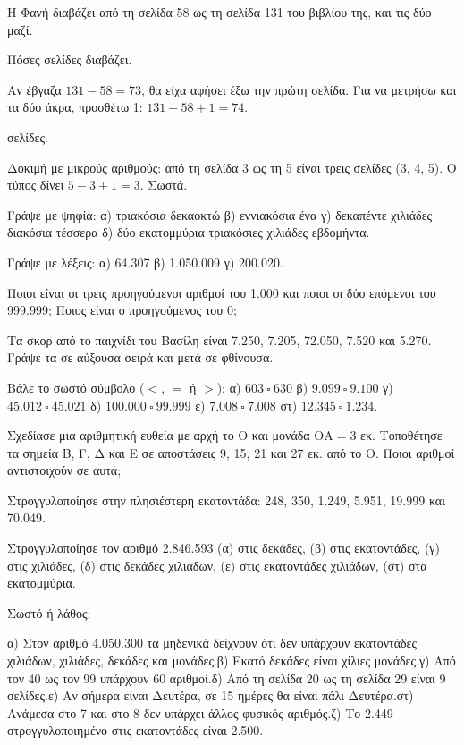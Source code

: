 \tixero Η Φανή διαβάζει από τη σελίδα 58 ως τη σελίδα 131 του βιβλίου της, και τις δύο μαζί.\par
\tithelo Πόσες σελίδες διαβάζει.\par
\possindeo Αν έβγαζα $131-58=73$, θα είχα αφήσει έξω την πρώτη σελίδα. Για να μετρήσω και τα δύο άκρα, προσθέτω 1: $131-58+1=74$.\par
{} σελίδες.\par
\elegxos Δοκιμή με μικρούς αριθμούς: από τη σελίδα 3 ως τη 5 είναι τρεις σελίδες (3, 4, 5). Ο τύπος δίνει $5-3+1=3$. Σωστά.



\ex Γράψε με ψηφία: α) τριακόσια δεκαοκτώ \quad β) εννιακόσια ένα \quad γ) δεκαπέντε χιλιάδες διακόσια τέσσερα \quad δ) δύο εκατομμύρια τριακόσιες χιλιάδες εβδομήντα.

\ex Γράψε με λέξεις: α) 64.307 \quad β) 1.050.009 \quad γ) 200.020.

\ex Ποιοι είναι οι τρεις προηγούμενοι αριθμοί του 1.000 και ποιοι οι δύο επόμενοι του 999.999; Ποιος είναι ο προηγούμενος του 0;

\ex Τα σκορ από το παιχνίδι του Βασίλη είναι 7.250, 7.205, 72.050, 7.520 και 5.270. Γράψε τα σε αύξουσα σειρά και μετά σε φθίνουσα.

\ex Βάλε το σωστό σύμβολο ($<$, $=$ ή $>$): α) $603\ \square\ 630$ \quad β) $9.099\ \square\ 9.100$ \quad γ) $45.012\ \square\ 45.021$ \quad δ) $100.000\ \square\ 99.999$ \quad ε) $7.008\ \square\ 7.008$ \quad στ) $12.345\ \square\ 1.234$.

\ex Σχεδίασε μια αριθμητική ευθεία με αρχή το Ο και μονάδα $\mathrm{ΟΑ}=3$ εκ. Τοποθέτησε τα σημεία Β, Γ, Δ και Ε σε αποστάσεις 9, 15, 21 και 27 εκ. από το Ο. Ποιοι αριθμοί αντιστοιχούν σε αυτά;

\ex Στρογγυλοποίησε στην πλησιέστερη εκατοντάδα: 248, 350, 1.249, 5.951, 19.999 και 70.049.

\ex Στρογγυλοποίησε τον αριθμό 2.846.593 (α) στις δεκάδες, (β) στις εκατοντάδες, (γ) στις χιλιάδες, (δ) στις δεκάδες χιλιάδων, (ε) στις εκατοντάδες χιλιάδων, (στ) στα εκατομμύρια.

\ex Σωστό ή λάθος;\par
α) Στον αριθμό 4.050.300 τα μηδενικά δείχνουν ότι δεν υπάρχουν εκατοντάδες χιλιάδων, χιλιάδες, δεκάδες και μονάδες.\quad β) Εκατό δεκάδες είναι χίλιες μονάδες.\quad γ) Από τον 40 ως τον 99 υπάρχουν 60 αριθμοί.\quad δ) Από τη σελίδα 20 ως τη σελίδα 29 είναι 9 σελίδες.\quad ε) Αν σήμερα είναι Δευτέρα, σε 15 ημέρες θα είναι πάλι Δευτέρα.\quad στ) Ανάμεσα στο 7 και στο 8 δεν υπάρχει άλλος φυσικός αριθμός.\quad ζ) Το 2.449 στρογγυλοποιημένο στις εκατοντάδες είναι 2.500.

